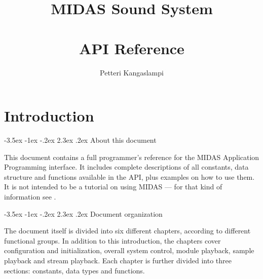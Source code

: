 \documentclass[a4paper,12pt,oneside]{book}
\author{Petteri Kangaslampi}
\title{MIDAS Sound System\\ \ \\ API Reference}
\makeatletter
\renewcommand\section{\@startsection {section}{1}{-20pt}%
                                   {-3.5ex \@plus -1ex \@minus -.2ex}%
                                   {2.3ex \@plus.2ex}%
                                   {\normalfont\Large\bfseries}}
\makeatother
\begin{document}
\maketitle
{}
\tableofcontents

\newpage
{}


\chapter{Introduction}



\section{About this document}

This document contains a full programmer's reference for the MIDAS
Application Programming interface. It includes complete descriptions of all
constants, data structure and functions available in the API, plus examples
on how to use them. It is not intended to be a tutorial on using MIDAS ---
for that kind of information see
.



\section{Document organization}

The document itself is divided into six different chapters, according to
different functional groups. In addition to this introduction, the chapters
cover configuration and initialization, overall system control, module
playback, sample playback and stream playback. Each chapter is further
divided into three sections: constants, data types and functions.




\end{document}

